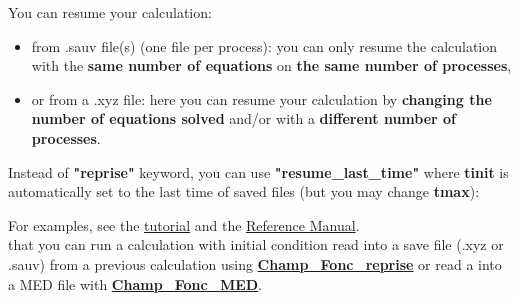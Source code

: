 You can resume your calculation:
\begin{itemize}
\item from .sauv file(s) (one file per process): you can only resume the calculation with the \textbf{same number of equations} on \textbf{the same number of processes},
\item or from a .xyz file: here you can resume your calculation by \textbf{changing the number of equations solved} and/or with a \textbf{different number of processes}.
\end{itemize}

Instead of \textbf{"reprise"} keyword, you can use \textbf{"resume\_last\_time"} where \textbf{tinit} is automatically set to the last time of saved files (but you may change \textbf{tmax}):
    \begin{center}
    \end{center}

For examples, see the \href{TRUST_tutorial.pdf\#save_restart}{\trust tutorial} and the \href{\REFERENCEMANUAL\#Pbbase}{\trustref Reference Manual}.\\

\Note that you can run a calculation with initial condition read into a save file (.xyz or .sauv) from a previous calculation using \href{\REFERENCEMANUAL\#champfoncreprise}{\textbf{Champ\_Fonc\_reprise}} or read a into a MED file with \href{\REFERENCEMANUAL\#champfoncmed}{\textbf{Champ\_Fonc\_MED}}.






